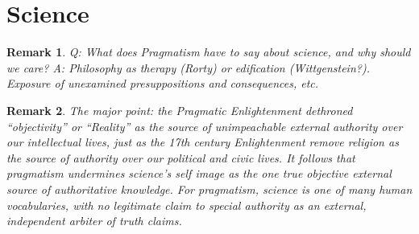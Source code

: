 \documentclass[11pt,twoside]{article}
\newtheorem{remark}{Remark}
\begin{document}
\cite{maynard_diversity_1991} \\
\cite{maynard_toward_2000} \\
\cite{price_true_question_1983} \\
\cite{price_expressivism_2013} \\
\cite{price_naturalism_2013} \\
\cite{price_pluralism_2013} \\
\cite{price_two_2013} \\
\cite{putnam_representation_1991} \\
\cite{putnam_collapse_2002} \\
\cite{putnam_three_2009}
\cite{rorty_method_1981} \\
\cite{rorty_representation_1988} \\
\cite{rorty_PMN} \\
\cite{schatzki_practice_2001} \\
\cite{sellars_empiricism_1997} \\
\cite{tate_foucault_2007} \\
\cite{weiss_reading_2009} \\
\cite{winship_ethnomethodology_2010} \\
\cite{zimmerman_review_1994}

\section{Science}

\begin{remark}
  Q: What does Pragmatism have to say about science, and why should we
  care?  A: Philosophy as therapy (Rorty) or edification
  (Wittgenstein?).  Exposure of unexamined presuppositions and
  consequences, etc.
\end{remark}

\begin{remark}
  The major point: the Pragmatic Enlightenment dethroned
  ``objectivity'' or ``Reality'' as the source of unimpeachable
  external authority over our intellectual lives, just as the 17th
  century Enlightenment remove religion as the source of authority
  over our political and civic lives.  It follows that pragmatism
  undermines science's self image as the one true objective external
  source of authoritative knowledge.  For pragmatism, science is one
  of many human vocabularies, with no legitimate claim to special
  authority as an external, independent arbiter of truth claims.
\end{remark}
\end{document}
